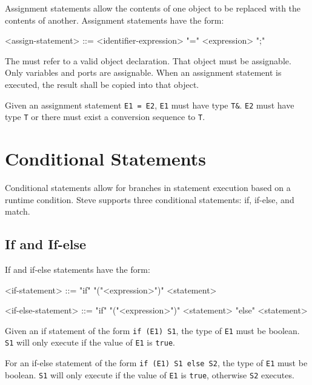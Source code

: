 Assignment statements allow the contents of one object to be replaced with the contents of another. Assignment statements have the form:

\begin{minip}
\begin{grammar}
<assign-statement> ::=
<identifier-expression> "=" <expression> ";"
\end{grammar}
\end{minip}

The  must refer to a valid object declaration. That object must be assignable. Only variables and ports are assignable. When an assignment statement is executed, the result  shall be copied into that object.

Given an assignment statement \texttt{E1 = E2}, \texttt{E1} must have type \texttt{T\&}. \texttt{E2} must have type \texttt{T} or there must exist a conversion sequence to \texttt{T}.

\section{Conditional Statements} \label{guide:condition_stmt}

Conditional statements allow for branches in statement execution based on a runtime condition. Steve supports three conditional statements: if, if-else, and match.

\subsection{If and If-else}

If and if-else statements have the form:

\begin{minip}
\begin{grammar}
<if-statement> ::= "if" "("<expression>")" <statement>

<if-else-statement> ::= "if" "("<expression>")" <statement> "else" <statement>
\end{grammar}
\end{minip}

Given an if statement of the form \texttt{if (E1) S1}, the type of \texttt{E1} must be boolean. \texttt{S1} will only execute if the value of \texttt{E1} is \texttt{true}.

For an if-else statement of the form \texttt{if (E1) S1 else S2}, the type of \texttt{E1} must be boolean. \texttt{S1} will only execute if the value of \texttt{E1} is \texttt{true}, otherwise \texttt{S2} executes.


